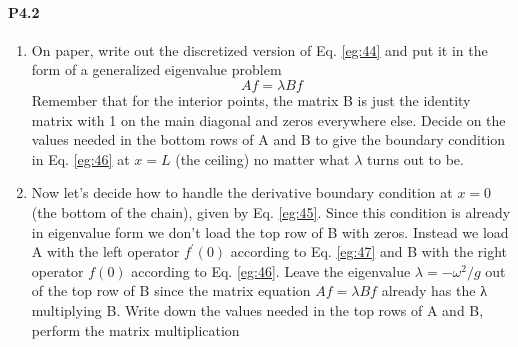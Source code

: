 \documentclass{book}
\theoremstyle{plain}
\theoremstyle{definition}
\numberwithin{exm}{chapter}
\theoremstyle{remark}
\theoremstyle{summary}
\theoremstyle{overview}
\begin{document}
				\paragraph*{P4.2}
				\begin{enumerate}[label=(\alph*)]
			\item	On paper, write out the discretized version of Eq. \eqref{eg:44} and put it in
the form of a generalized eigenvalue problem
\begin{equation}\label{eq:48}
		Af = \lambda B f
				\end{equation}
					Remember that for the interior points, the matrix B is just the identity
matrix with 1 on the main diagonal and zeros everywhere else. Decide on the values needed in the bottom rows of A and B to give the
boundary condition in Eq. \eqref{eg:46} at $x = L$ (the ceiling) no matter what
$\lambda$ turns out to be.
\item Now let\rq s decide how to handle the derivative boundary condition at
$x = 0$ (the bottom of the chain), given by Eq. \eqref{eg:45}. Since this condition
is already in eigenvalue form we don\rq t load the top row of B with zeros.
Instead we load A with the left operator $f^\prime (0)$ according to Eq. \eqref{eg:47}
and B with the right operator $f(0)$  according to Eq. \eqref{eg:46}. Leave the
eigenvalue $ \lambda = − \omega ^ 2
/g$ out of the top row of B since the matrix equation
$Af = \lambda Bf$ already has the λ multiplying B. Write down the values
needed in the top rows of A and B, perform the matrix multiplication

\end{enumerate}
\end{document}
